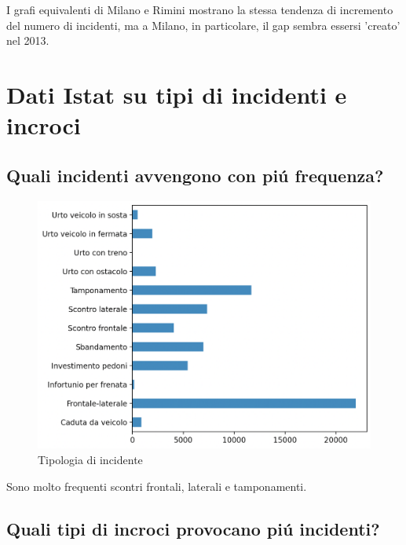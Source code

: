\documentclass[a4paper]{report}
\begin{document}
I grafi equivalenti di Milano e Rimini mostrano la stessa tendenza di incremento del numero 
di incidenti, ma a Milano, in particolare, il gap sembra essersi 'creato' nel 2013.


\clearpage
\section{Dati Istat su tipi di incidenti e incroci}

\clearpage
\subsection{Quali incidenti avvengono con pi\'u frequenza?}

\begin{figure}[!ht]
    \includegraphics[width=\linewidth]{../src/incidenti/incidenti_senza_coords/localizzazione_incidente/tipo_incidente.png}
    \caption{Tipologia di incidente}
    \label{fig:tipo_incidente}
\end{figure}

Sono molto frequenti scontri frontali, laterali e tamponamenti.

\clearpage
\subsection{Quali tipi di incroci provocano pi\'u incidenti?}
\end{document}
